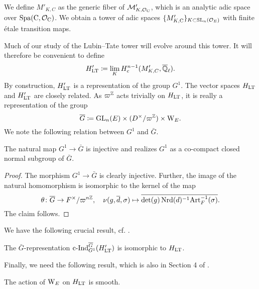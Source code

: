 \documentclass[../main.tex]{subfiles}
\begin{document}
We define $M'_{K, C}$ as the generic fiber of $\mathcal{M}'_{K, \mathcal{O}_{\mathrm{C}}}$, which is 
an analytic adic space over $\operatorname{Spa}({\mathrm{C}}, \mathcal{O}_{\mathrm{C}})$. We obtain a tower of adic spaces
$\{M'_{K, {\mathrm{C}}}\}_{K \subset \operatorname{SL}_n(\mathcal{O}_E)}$ with finite \'etale transition maps. 

Much of our study of the Lubin--Tate tower will evolve around
this tower. It will therefore be convenient to define 
\begin{equation*}
  H_{\mathrm{LT}}' \coloneqq \lim_K H^{n-1}_c(M_{K,C}', {\overline {\mathbb{Q}}_\ell}).
\end{equation*}
By construction, $H_{\mathrm{LT}}'$ is a representation of the group $G^1$. 
The vector spaces $H_{\mathrm{LT}}$ and $H_{\mathrm{LT}}'$ are closely related. 
As $\varpi^{\mathbb{Z}}$ acts trivially on $H_{\mathrm{LT}}$, it is really a representation of the group
\begin{equation*}
  \overline G \coloneqq \operatorname{GL}_n(E) \times (D^\times/\varpi^{\mathbb{Z}}) \times \mathrm W_E.
\end{equation*}
We note the following relation between $G^1$ and $\bar G$.
\begin{lem}\label{lem:G1subG}
  The natural map $G^1 \to \bar G$ is injective and realizes $G^1$ as a co-compact closed
  normal subgroup of $\bar G$.
\begin{proof}
  The morphism $G^1 \to \bar G$ is clearly injective. Further, the image of the natural
  homomorphism is isomorphic to the kernel of the map 
  \begin{equation*}
   \theta \colon \overline G \to F^\times/\varpi^{n\mathbb{Z}}, \quad \nu(g, \overline d, \sigma) \mapsto 
 \overline{\det(g)\operatorname{Nrd}(d)^{-1}\mathrm{Art}_F^{-1}(\sigma)}.
  \end{equation*}
  The claim follows.
\end{proof}
\end{lem}

We have the following crucial result, cf. \cite[Section 4]{mieda2016geometric}.
\begin{prop}\label{lem:InductionStatementOnHLT}
  The $\bar G$-representation $\mathrm{c\text{-}Ind}_{G^1}^{\overline G} (H'_{\mathrm{LT}})$ is isomorphic to $H_{\mathrm{LT}}$. 
\end{prop}

Finally, we need the following result, which is also in Section 4 of
\cite{mieda2016geometric}.
\begin{lem}\label{lem:GActsSmoothlyOnHLT}
  The action of $\mathrm W_E$ on $H_{\mathrm{LT}}$ is smooth.
\end{lem}



\end{document}
